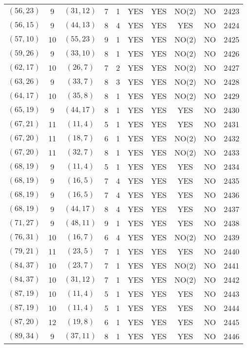 \begin{longtable}{|c|c|c|c|c|c|c|c|c|c|}
$(56, 23)$ & 9 & $(31, 12)$ & 7 & 1 & YES & YES & NO(2) & NO & 2423\\
$(56, 15)$ & 9 & $(44, 13)$ & 8 & 4 & YES & YES & YES & NO & 2424\\
$(57, 10)$ & 10 & $(55, 23)$ & 9 & 1 & YES & YES & NO(2) & NO & 2425\\
$(59, 26)$ & 9 & $(33, 10)$ & 8 & 1 & YES & YES & NO(2) & NO & 2426\\
$(62, 17)$ & 10 & $(26, 7)$ & 7 & 2 & YES & YES & NO(2) & NO & 2427\\
$(63, 26)$ & 9 & $(33, 7)$ & 8 & 3 & YES & YES & NO(2) & NO & 2428\\
$(64, 17)$ & 10 & $(35, 8)$ & 8 & 1 & YES & YES & NO(2) & NO & 2429\\
$(65, 19)$ & 9 & $(44, 17)$ & 8 & 1 & YES & YES & YES & NO & 2430\\
$(67, 21)$ & 11 & $(11, 4)$ & 5 & 1 & YES & YES & YES & NO & 2431\\
$(67, 20)$ & 11 & $(18, 7)$ & 6 & 1 & YES & YES & NO(2) & NO & 2432\\
$(67, 20)$ & 11 & $(32, 7)$ & 8 & 1 & YES & YES & NO(2) & NO & 2433\\
$(68, 19)$ & 9 & $(11, 4)$ & 5 & 1 & YES & YES & YES & NO & 2434\\
$(68, 19)$ & 9 & $(16, 5)$ & 7 & 4 & YES & YES & YES & NO & 2435\\
$(68, 19)$ & 9 & $(16, 5)$ & 7 & 4 & YES & YES & YES & NO & 2436\\
$(68, 19)$ & 9 & $(44, 17)$ & 8 & 4 & YES & YES & YES & NO & 2437\\
$(71, 27)$ & 9 & $(48, 11)$ & 9 & 1 & YES & YES & YES & NO & 2438\\
$(76, 31)$ & 10 & $(16, 7)$ & 6 & 4 & YES & YES & NO(2) & NO & 2439\\
$(79, 21)$ & 11 & $(23, 5)$ & 7 & 1 & YES & YES & YES & NO & 2440\\
$(84, 37)$ & 10 & $(23, 7)$ & 7 & 1 & YES & YES & NO(2) & NO & 2441\\
$(84, 37)$ & 10 & $(31, 12)$ & 7 & 1 & YES & YES & NO(2) & NO & 2442\\
$(87, 19)$ & 10 & $(11, 4)$ & 5 & 1 & YES & YES & YES & NO & 2443\\
$(87, 19)$ & 10 & $(11, 4)$ & 5 & 1 & YES & YES & YES & NO & 2444\\
$(87, 20)$ & 12 & $(19, 8)$ & 6 & 1 & YES & YES & YES & NO & 2445\\
$(89, 34)$ & 9 & $(37, 11)$ & 8 & 1 & YES & YES & YES & NO & 2446\\

\end{longtable}
